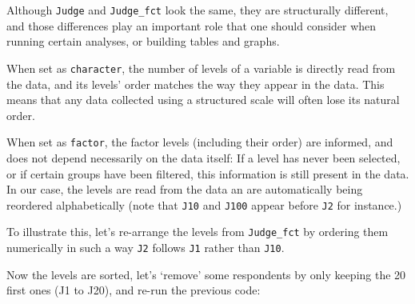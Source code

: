 \documentclass[
]{book}
\newenvironment{Shaded}{\begin{snugshade}}{\end{snugshade}}
\newcommand{\AttributeTok}[1]{\textcolor[rgb]{0.77,0.63,0.00}{#1}}
\newcommand{\ConstantTok}[1]{\textcolor[rgb]{0.00,0.00,0.00}{#1}}
\newcommand{\DecValTok}[1]{\textcolor[rgb]{0.00,0.00,0.81}{#1}}
\newcommand{\FunctionTok}[1]{\textcolor[rgb]{0.00,0.00,0.00}{#1}}
\newcommand{\NormalTok}[1]{#1}
\newcommand{\OtherTok}[1]{\textcolor[rgb]{0.56,0.35,0.01}{#1}}
\newcommand{\SpecialCharTok}[1]{\textcolor[rgb]{0.00,0.00,0.00}{#1}}
\newcommand{\StringTok}[1]{\textcolor[rgb]{0.31,0.60,0.02}{#1}}
\begin{document}
Although \texttt{Judge} and \texttt{Judge\_fct} look the same, they are structurally different, and those differences play an important role that one should consider when running certain analyses, or building tables and graphs.

When set as \texttt{character}, the number of levels of a variable is directly read from the data, and its levels' order matches the way they appear in the data. This means that any data collected using a structured scale will often lose its natural order.

When set as \texttt{factor}, the factor levels (including their order) are informed, and does not depend necessarily on the data itself: If a level has never been selected, or if certain groups have been filtered, this information is still present in the data. In our case, the levels are read from the data an are automatically being reordered alphabetically (note that \texttt{J10} and \texttt{J100} appear before \texttt{J2} for instance.)

To illustrate this, let's re-arrange the levels from \texttt{Judge\_fct} by ordering them numerically in such a way \texttt{J2} follows \texttt{J1} rather than \texttt{J10}.

\begin{Shaded}
\end{Shaded}

Now the levels are sorted, let's `remove' some respondents by only keeping the 20 first ones (J1 to J20), and re-run the previous code:

\begin{Shaded}
\end{Shaded}
\end{document}
